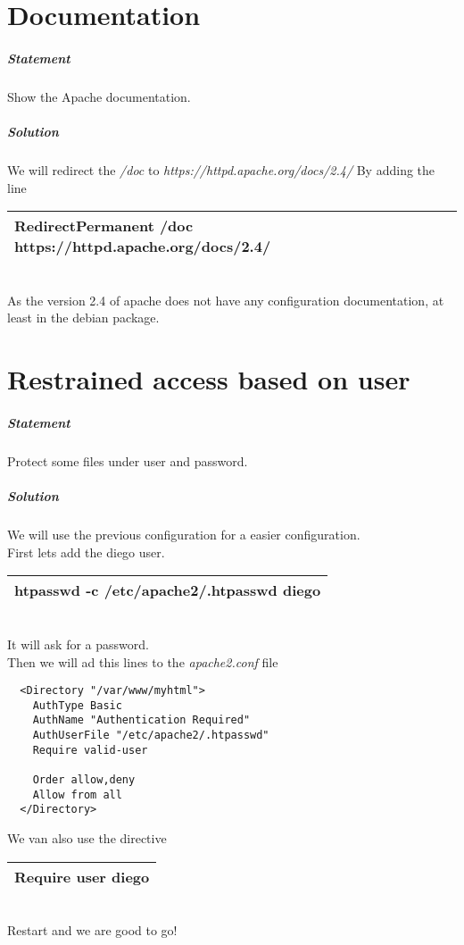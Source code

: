 \documentclass[a4paper,10pt]{article}
\begin{document}
\section{Documentation}
\subparagraph{Statement}
Show the Apache documentation.
\subparagraph{Solution}
We will redirect the {\it /doc} to {\it https://httpd.apache.org/docs/2.4/} By adding the line
\vspace{0.5cm}\\\begin{tabular}{|l|}\hline
RedirectPermanent /doc https://httpd.apache.org/docs/2.4/
\\\hline\end{tabular}\vspace{0.5cm}\\
As the version 2.4 of apache does not have any configuration documentation, at least in the debian package.

\section{Restrained access based on user}
\subparagraph{Statement}
Protect some files under user and password.
\subparagraph{Solution}
We will use the previous configuration for a easier configuration.\\
First lets add the diego user.
\vspace{0.5cm}\\\begin{tabular}{|l|}\hline
htpasswd -c /etc/apache2/.htpasswd diego
\\\hline\end{tabular}\vspace{0.5cm}\\
It will ask for a password.\\
Then we will ad this lines to the {\it apache2.conf} file
\begin{verbatim}
  <Directory "/var/www/myhtml">
    AuthType Basic
    AuthName "Authentication Required"
    AuthUserFile "/etc/apache2/.htpasswd"
    Require valid-user

    Order allow,deny
    Allow from all
  </Directory>
\end{verbatim}
We van also use the directive
\vspace{0.5cm}\\\begin{tabular}{|l|}\hline
Require user diego
\\\hline\end{tabular}\vspace{0.5cm}\\
Restart and we are good to go!
\pagebreak
\end{document}
